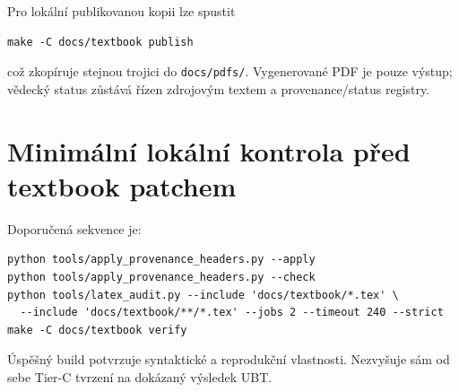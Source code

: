 Pro lokální publikovanou kopii lze spustit
\begin{verbatim}
make -C docs/textbook publish
\end{verbatim}
což zkopíruje stejnou trojici do \texttt{docs/pdfs/}. Vygenerované PDF je pouze
výstup; vědecký status zůstává řízen zdrojovým textem a provenance/status
registry.

\section{Minimální lokální kontrola před textbook patchem}
Doporučená sekvence je:
\begin{verbatim}
python tools/apply_provenance_headers.py --apply
python tools/apply_provenance_headers.py --check
python tools/latex_audit.py --include 'docs/textbook/*.tex' \
  --include 'docs/textbook/**/*.tex' --jobs 2 --timeout 240 --strict
make -C docs/textbook verify
\end{verbatim}
Úspěšný build potvrzuje syntaktické a reprodukční vlastnosti. Nezvyšuje sám od
sebe Tier-C tvrzení na dokázaný výsledek UBT.
